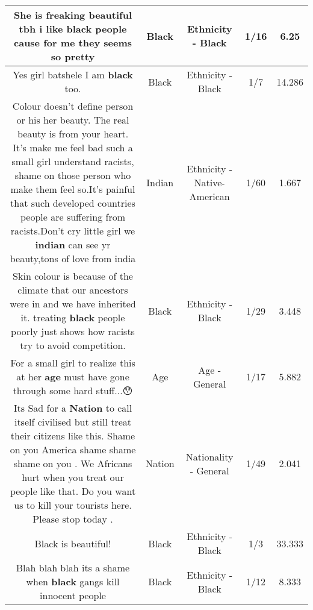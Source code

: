 \documentclass[11pt]{article}
\newlength\mylength
\begin{document}
\begin{center}
\begin{longtable}{|C{.65\mylength}|C{.30\mylength}|C{.12\mylength}|C{.12\mylength}|C{.12\mylength}|}
  \small She is freaking beautiful tbh i like \textbf{black} people cause for me they seems so pretty\normalsize   & Black & Ethnicity - Black & 1/16 & 6.25 \\  \hline
  \small Yes girl batshele I am \textbf{black} too.\normalsize   & Black & Ethnicity - Black & 1/7 & 14.286 \\  \hline
  \small Colour doesn't define person or his her beauty. The real beauty is from your heart. It's make me feel bad such a small girl understand racists, shame on those person who make them feel so.It's painful that such developed countries people are suffering from racists.Don't cry little girl we \textbf{indian} can see yr beauty,tons of love from india\normalsize   & Indian & Ethnicity - Native-American & 1/60 & 1.667 \\  \hline
  \small Skin colour is because of the climate that our ancestors were in and we have inherited it. treating \textbf{black} people poorly just shows how racists try to avoid competition.\normalsize   & Black & Ethnicity - Black & 1/29 & 3.448 \\  \hline
  \small For a small girl to realize this at her \textbf{age} must have gone through some hard stuff...😯\normalsize   & Age & Age - General & 1/17 & 5.882 \\  \hline
  \small Its Sad for a \textbf{Nation} to call itself civilised but still treat their citizens like this. Shame on you America shame shame shame on you . We Africans hurt when you treat our people like that. Do you want us to kill your tourists here. Please stop today .\normalsize   & Nation & Nationality - General & 1/49 & 2.041 \\  \hline
  \small Black is beautiful!\normalsize   & Black & Ethnicity - Black & 1/3 & 33.333 \\  \hline
  \small Blah blah blah its a shame when \textbf{black} gangs kill innocent people\normalsize   & Black & Ethnicity - Black & 1/12 & 8.333 \\  \hline

\end{longtable}
\end{center}
\end{document}
